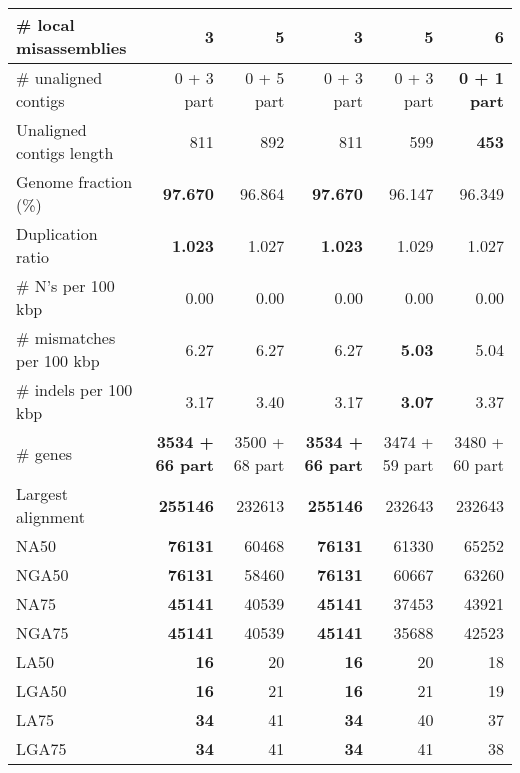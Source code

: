 \documentclass[12pt,a4paper]{article}
\begin{document}
\begin{table}[ht]
\begin{center}
\begin{tabular}{|l*{5}{|r}|}
\# local misassemblies & {\bf 3} & 5 & {\bf 3} & 5 & 6 \\ \hline
\# unaligned contigs & 0 + 3 part & 0 + 5 part & 0 + 3 part & 0 + 3 part & {\bf 0 + 1 part} \\ \hline
Unaligned contigs length & 811 & 892 & 811 & 599 & {\bf 453} \\ \hline
Genome fraction (\%) & {\bf 97.670} & 96.864 & {\bf 97.670} & 96.147 & 96.349 \\ \hline
Duplication ratio & {\bf 1.023} & 1.027 & {\bf 1.023} & 1.029 & 1.027 \\ \hline
\# N's per 100 kbp & 0.00 & 0.00 & 0.00 & 0.00 & 0.00 \\ \hline
\# mismatches per 100 kbp & 6.27 & 6.27 & 6.27 & {\bf 5.03} & 5.04 \\ \hline
\# indels per 100 kbp & 3.17 & 3.40 & 3.17 & {\bf 3.07} & 3.37 \\ \hline
\# genes & {\bf 3534 + 66 part} & 3500 + 68 part & {\bf 3534 + 66 part} & 3474 + 59 part & 3480 + 60 part \\ \hline
Largest alignment & {\bf 255146} & 232613 & {\bf 255146} & 232643 & 232643 \\ \hline
NA50 & {\bf 76131} & 60468 & {\bf 76131} & 61330 & 65252 \\ \hline
NGA50 & {\bf 76131} & 58460 & {\bf 76131} & 60667 & 63260 \\ \hline
NA75 & {\bf 45141} & 40539 & {\bf 45141} & 37453 & 43921 \\ \hline
NGA75 & {\bf 45141} & 40539 & {\bf 45141} & 35688 & 42523 \\ \hline
LA50 & {\bf 16} & 20 & {\bf 16} & 20 & 18 \\ \hline
LGA50 & {\bf 16} & 21 & {\bf 16} & 21 & 19 \\ \hline
LA75 & {\bf 34} & 41 & {\bf 34} & 40 & 37 \\ \hline
LGA75 & {\bf 34} & 41 & {\bf 34} & 41 & 38 \\ \hline
\end{tabular}
\end{center}
\end{table}
\end{document}
